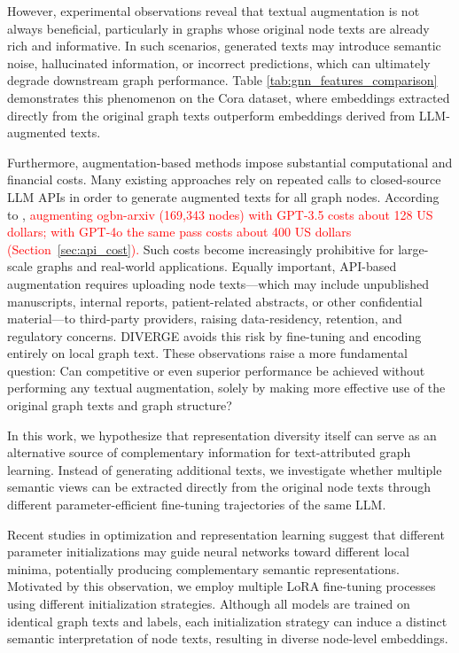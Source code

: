 \documentclass[a4paper,fleqn]{cas-sc}
\newcommand{\revone}[1]{\textcolor{red}{#1}}   %
\begin{document}
However, experimental observations reveal that textual augmentation is not always beneficial, particularly in graphs whose original node texts are already rich and informative. In such scenarios, generated texts may introduce semantic noise, hallucinated information, or incorrect predictions, which can ultimately degrade downstream graph performance. Table \ref{tab:gnn_features_comparison} demonstrates this phenomenon on the Cora dataset, where embeddings extracted directly from the original graph texts outperform embeddings derived from LLM-augmented texts.

Furthermore, augmentation-based methods impose substantial computational and financial costs. Many existing approaches rely on repeated calls to closed-source LLM APIs in order to generate augmented texts for all graph nodes. According to \citet{he2024harnessing}, \revone{augmenting ogbn-arxiv (169{,}343 nodes) with GPT-3.5 costs about 128 US dollars; with GPT-4o the same pass costs about 400 US dollars (Section~\ref{sec:api_cost}).} Such costs become increasingly prohibitive for large-scale graphs and real-world applications. Equally important, API-based augmentation requires uploading node texts---which may include unpublished manuscripts, internal reports, patient-related abstracts, or other confidential material---to third-party providers, raising data-residency, retention, and regulatory concerns. DIVERGE avoids this risk by fine-tuning and encoding entirely on local graph text.
These observations raise a more fundamental question: 
Can competitive or even superior performance be achieved without performing any textual augmentation, solely by making more effective use of the original graph texts and graph structure?

In this work, we hypothesize that representation diversity itself can serve as an alternative source of complementary information for text-attributed graph learning. Instead of generating additional texts, we investigate whether multiple semantic views can be extracted directly from the original node texts through different parameter-efficient fine-tuning trajectories of the same LLM.

Recent studies in optimization and representation learning suggest that different parameter initializations may guide neural networks toward different local minima, potentially producing complementary semantic representations. Motivated by this observation, we employ multiple LoRA fine-tuning processes using different initialization strategies. Although all models are trained on identical graph texts and labels, each initialization strategy can induce a distinct semantic interpretation of node texts, resulting in diverse node-level embeddings.
\end{document}
